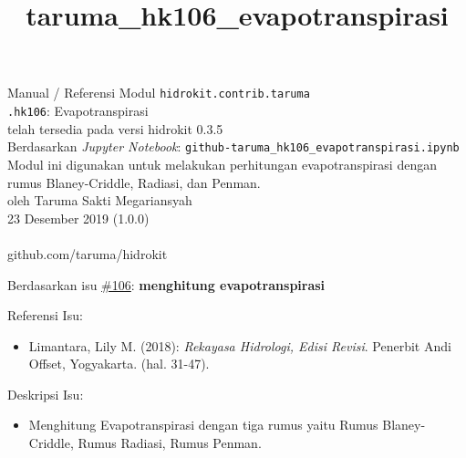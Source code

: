 \documentclass[11pt]{article}
\title{taruma\_hk106\_evapotranspirasi}
\providecommand{\tightlist}{%
      \setlength{\itemsep}{0pt}\setlength{\parskip}{0pt}}
\begin{document}
  
	\begin{titlepage}
		\vspace*{\fill}
		\begin{center}
 		\normalsize Manual / Referensi Modul \texttt{hidrokit.contrib.taruma}\\
		\huge \texttt{.hk106}: Evapotranspirasi\\ 
		\small telah tersedia pada versi hidrokit 0.3.5 \\[0.2cm]
      	\small Berdasarkan \emph{Jupyter Notebook}: \texttt{github-taruma\_hk106\_evapotranspirasi.ipynb} \\[0.5cm]
      	\small Modul ini digunakan untuk melakukan perhitungan evapotranspirasi dengan rumus Blaney-Criddle, Radiasi, dan Penman. \\[0.5cm]
		\normalsize oleh Taruma Sakti Megariansyah\\[0.5cm]
      	\normalsize 23 Desember 2019 (1.0.0)\\[1cm]
    	\\
      	\normalsize github.com/taruma/hidrokit
		\end{center}
    	\vspace*{\fill}
	\end{titlepage}
    
    

    
    

    Berdasarkan isu
\href{https://github.com/taruma/hidrokit/issues/106}{\#106}:
\textbf{menghitung evapotranspirasi}

Referensi Isu:

\begin{itemize}
\tightlist
\item
  Limantara, Lily M. (2018): \emph{Rekayasa Hidrologi, Edisi Revisi}.
  Penerbit Andi Offset, Yogyakarta. (hal. 31-47).
\end{itemize}

Deskripsi Isu:

\begin{itemize}
\tightlist
\item
  Menghitung Evapotranspirasi dengan tiga rumus yaitu Rumus
  Blaney-Criddle, Rumus Radiasi, Rumus Penman.
\end{itemize}
\end{document}

